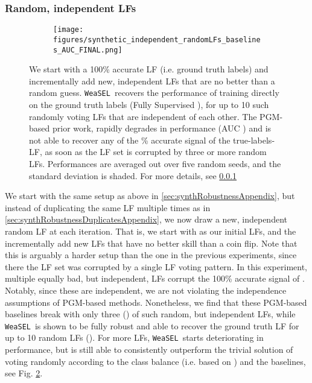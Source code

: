 \documentclass{article}
\newcommand{\weasel}{\texttt{WeaSEL}}\newcommand{\brackets}[1]{\left( #1 \right)}
\begin{document}
\subsubsection{Random, independent LFs}
\label{sec:synthRobustnessIndependentAppendix}
\begin{figure}
    \begin{subfigure}{.95\textwidth}
      \centering
      \texttt{[image: figures/synthetic\_independent\_randomLFs\_baselines\_AUC\_FINAL.png]}
      \label{fig:synthRobustnessIndepRandomLFsAUC}
    \end{subfigure}\caption{We start with a 100\% accurate LF (i.e. ground truth labels) and incrementally add new, independent LFs that are no better than a random guess.
  \weasel\ recovers the performance of training directly on the ground truth labels (Fully Supervised ), for up to 10 such randomly voting LFs that are independent of each other.
  The PGM-based prior work, rapidly degrades in performance (AUC ) and is not able to recover any of the \% accurate signal of the true-labels-LF, as soon as the LF set is corrupted by three or more random LFs.
  Performances are averaged out over five random seeds, and the standard deviation is shaded. For more details, see \ref{sec:synthRobustnessIndependentAppendix}}
  \label{fig:synthRobustnessIndepRandomLFs}
\end{figure} We start with the same setup as above in \ref{sec:synthRobustnessAppendix}, but instead of duplicating the same LF multiple times as in \ref{sec:synthRobustnessDuplicatesAppendix}, we now draw a new, independent random LF at each iteration.
That is, we start with   as our initial LFs, and the incrementally add new LFs  that have no better skill than a coin flip.
Note that this is arguably a harder setup than the one in the previous experiments, since there the LF set was corrupted by a single LF voting pattern. In this experiment, multiple equally bad, but independent, LFs corrupt the 100\% accurate signal of . Notably, since these  are independent, we are not violating the independence assumptions of PGM-based methods.
Nonetheless, we find that these PGM-based baselines break with only three () of such random, but independent LFs, while \weasel\
is shown to be fully robust and able to recover the ground truth LF  for up to 10 random LFs (). For more LFs, \weasel\ starts deteriorating in performance, but is still able to consistently outperform the trivial solution of voting randomly according to the class balance (i.e. based on ) and the baselines, see Fig. \ref{fig:synthRobustnessIndepRandomLFs}.
\end{document}
